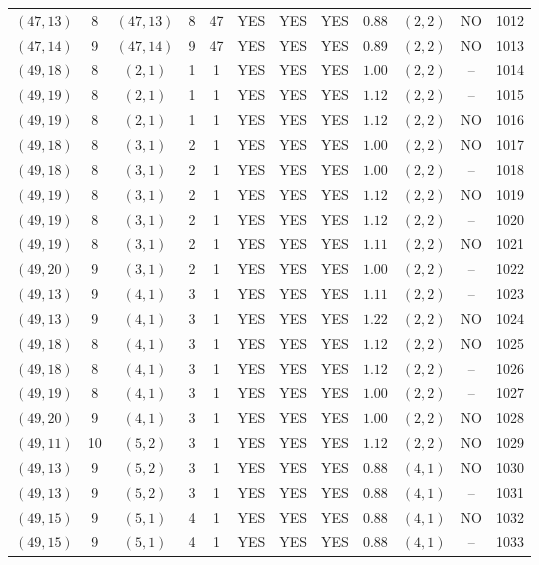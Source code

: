 \begin{longtable}{|c|c|c|c|c|c|c|c|c|c|c|c|}
$(47,13)$ & 8 & $(47,13)$ & 8 & 47 & YES & YES & YES & $0.88$ & $(2,2)$ & NO & 1012\\
$(47,14)$ & 9 & $(47,14)$ & 9 & 47 & YES & YES & YES & $0.89$ & $(2,2)$ & NO & 1013\\
$(49,18)$ & 8 & $(2,1)$ & 1 & 1 & YES & YES & YES & $1.00$ & $(2,2)$ & -- & 1014\\
$(49,19)$ & 8 & $(2,1)$ & 1 & 1 & YES & YES & YES & $1.12$ & $(2,2)$ & -- & 1015\\
$(49,19)$ & 8 & $(2,1)$ & 1 & 1 & YES & YES & YES & $1.12$ & $(2,2)$ & NO & 1016\\
$(49,18)$ & 8 & $(3,1)$ & 2 & 1 & YES & YES & YES & $1.00$ & $(2,2)$ & NO & 1017\\
$(49,18)$ & 8 & $(3,1)$ & 2 & 1 & YES & YES & YES & $1.00$ & $(2,2)$ & -- & 1018\\
$(49,19)$ & 8 & $(3,1)$ & 2 & 1 & YES & YES & YES & $1.12$ & $(2,2)$ & NO & 1019\\
$(49,19)$ & 8 & $(3,1)$ & 2 & 1 & YES & YES & YES & $1.12$ & $(2,2)$ & -- & 1020\\
$(49,19)$ & 8 & $(3,1)$ & 2 & 1 & YES & YES & YES & $1.11$ & $(2,2)$ & NO & 1021\\
$(49,20)$ & 9 & $(3,1)$ & 2 & 1 & YES & YES & YES & $1.00$ & $(2,2)$ & -- & 1022\\
$(49,13)$ & 9 & $(4,1)$ & 3 & 1 & YES & YES & YES & $1.11$ & $(2,2)$ & -- & 1023\\
$(49,13)$ & 9 & $(4,1)$ & 3 & 1 & YES & YES & YES & $1.22$ & $(2,2)$ & NO & 1024\\
$(49,18)$ & 8 & $(4,1)$ & 3 & 1 & YES & YES & YES & $1.12$ & $(2,2)$ & NO & 1025\\
$(49,18)$ & 8 & $(4,1)$ & 3 & 1 & YES & YES & YES & $1.12$ & $(2,2)$ & -- & 1026\\
$(49,19)$ & 8 & $(4,1)$ & 3 & 1 & YES & YES & YES & $1.00$ & $(2,2)$ & -- & 1027\\
$(49,20)$ & 9 & $(4,1)$ & 3 & 1 & YES & YES & YES & $1.00$ & $(2,2)$ & NO & 1028\\
$(49,11)$ & 10 & $(5,2)$ & 3 & 1 & YES & YES & YES & $1.12$ & $(2,2)$ & NO & 1029\\
$(49,13)$ & 9 & $(5,2)$ & 3 & 1 & YES & YES & YES & $0.88$ & $(4,1)$ & NO & 1030\\
$(49,13)$ & 9 & $(5,2)$ & 3 & 1 & YES & YES & YES & $0.88$ & $(4,1)$ & -- & 1031\\
$(49,15)$ & 9 & $(5,1)$ & 4 & 1 & YES & YES & YES & $0.88$ & $(4,1)$ & NO & 1032\\
$(49,15)$ & 9 & $(5,1)$ & 4 & 1 & YES & YES & YES & $0.88$ & $(4,1)$ & -- & 1033\\

\end{longtable}
